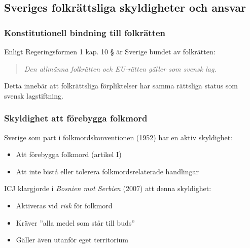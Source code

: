 %
%
%
%



\subsection{Sveriges folkrättsliga skyldigheter och ansvar}
\label{subsec:svenska_skyldigheter}

\subsubsection{Konstitutionell bindning till folkrätten}
Enligt Regeringsformen 1 kap. 10 § är Sverige bundet av folkrätten:
\begin{quote}
\textit{Den allmänna folkrätten och EU-rätten gäller som svensk lag.}
\end{quote}
Detta innebär att folkrättsliga förpliktelser har samma rättsliga status som svensk lagstiftning.

\subsubsection{Skyldighet att förebygga folkmord}
Sverige som part i folkmordskonventionen (1952) har en aktiv skyldighet:
\begin{itemize}
\item Att förebygga folkmord (artikel I)
\item Att inte bistå eller tolerera folkmordsrelaterade handlingar
\end{itemize}
ICJ klargjorde i \textit{Bosnien mot Serbien} (2007) att denna skyldighet:
\begin{itemize}
\item Aktiveras vid \textit{risk} för folkmord
\item Kräver ”alla medel som står till buds”
\item Gäller även utanför eget territorium
\end{itemize}

